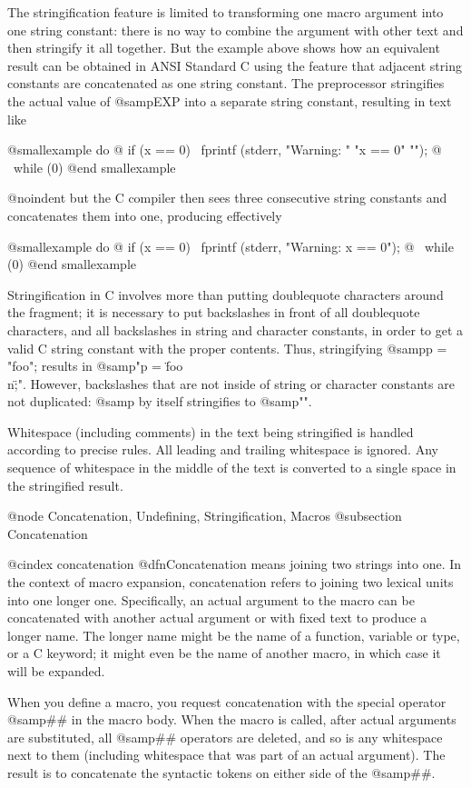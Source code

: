 {The stringification feature is limited to transforming one macro argument
into one string constant: there is no way to combine the argument with
other text and then stringify it all together.  But the example above shows
how an equivalent result can be obtained in ANSI Standard C using the
feature that adjacent string constants are concatenated as one string
constant.  The preprocessor stringifies the actual value of @samp{EXP} 
into a separate string constant, resulting in text like

@smallexample
do @{ if (x == 0) \
        fprintf (stderr, "Warning: " "x == 0" "\n"); @} \
while (0)
@end smallexample

@noindent
but the C compiler then sees three consecutive string constants and
concatenates them into one, producing effectively

@smallexample
do @{ if (x == 0) \
        fprintf (stderr, "Warning: x == 0\n"); @} \
while (0)
@end smallexample

Stringification in C involves more than putting doublequote characters
around the fragment; it is necessary to put backslashes in front of all
doublequote characters, and all backslashes in string and character
constants, in order to get a valid C string constant with the proper
contents.  Thus, stringifying @samp{p = "foo\n";} results in @samp{"p =
\"foo\\n\";"}.  However, backslashes that are not inside of string or
character constants are not duplicated: @samp{\n} by itself stringifies to
@samp{"\n"}.

Whitespace (including comments) in the text being stringified is handled
according to precise rules.  All leading and trailing whitespace is ignored.
Any sequence of whitespace in the middle of the text is converted to
a single space in the stringified result.

@node Concatenation, Undefining, Stringification, Macros
@subsection Concatenation

@cindex concatenation
@dfn{Concatenation} means joining two strings into one.  In the context
of macro expansion, concatenation refers to joining two lexical units
into one longer one.  Specifically, an actual argument to the macro can be
concatenated with another actual argument or with fixed text to produce
a longer name.  The longer name might be the name of a function,
variable or type, or a C keyword; it might even be the name of another
macro, in which case it will be expanded.

When you define a macro, you request concatenation with the special
operator @samp{##} in the macro body.  When the macro is called,
after actual arguments are substituted, all @samp{##} operators are
deleted, and so is any whitespace next to them (including whitespace
that was part of an actual argument).  The result is to concatenate
the syntactic tokens on either side of the @samp{##}.

}
